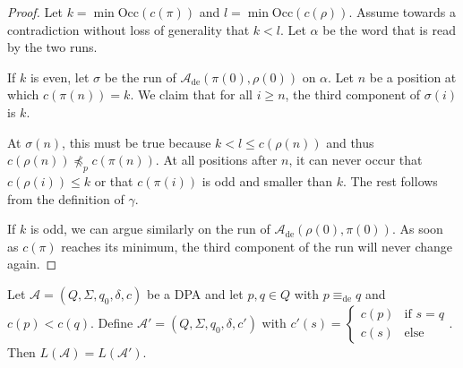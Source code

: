 \begin{proof}
	Let $k = \min \text{Occ}(c(\pi))$ and $l = \min \text{Occ}(c(\rho))$. Assume towards a contradiction without loss of generality that $k < l$. Let $\alpha$ be the word that is read by the two runs.
	
	If $k$ is even, let $\sigma$ be the run of $\mathcal{A}_\text{de}(\pi(0), \rho(0))$ on $\alpha$. Let $n$ be a position at which $c(\pi(n)) = k$. We claim that for all $i \geq n$, the third component of $\sigma(i)$ is $k$.
	
	At $\sigma(n)$, this must be true because $k < l \leq c(\rho(n))$ and thus $c(\rho(n)) \not\preceq_p c(\pi(n))$. At all positions after $n$, it can never occur that $c(\rho(i)) \leq k$ or that $c(\pi(i))$ is odd and smaller than $k$. The rest follows from the definition of $\gamma$.
	
	If $k$ is odd, we can argue similarly on the run of $\mathcal{A}_\text{de}(\rho(0), \pi(0))$. As soon as $c(\pi)$ reaches its minimum, the third component of the run will never change again.
\end{proof}

\begin{theorem}
	Let $\mathcal{A} = (Q, \Sigma, q_0, \delta, c)$ be a DPA and let $p, q \in Q$ with $p \equiv_\text{de} q$ and $c(p) < c(q)$. Define $\mathcal{A}' = (Q, \Sigma, q_0, \delta, c')$ with $c'(s) = \begin{cases} c(p) & \text{if } s = q \\ c(s) & \text{else} \end{cases}$. Then $L(\mathcal{A}) = L(\mathcal{A}')$.
\end{theorem}

